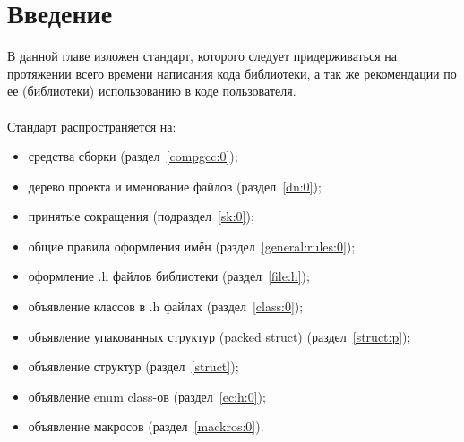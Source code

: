 \section{Введение}
В данной главе изложен стандарт, которого следует придерживаться на протяжении всего времени написания кода библиотеки, а так же рекомендации по ее (библиотеки) использованию в коде пользователя.\\\\
Стандарт распространяется на:
\begin{itemize}
	\item средства сборки (раздел~\ref{compgcc:0});
	\item дерево проекта и именование файлов (раздел~\ref{dn:0});
	\item принятые сокращения (подраздел~\ref{sk:0});
	\item общие правила оформления имён (раздел~\ref{general:rules:0});
	\item оформление .h файлов библиотеки (раздел~\ref{file:h});
	\item объявление классов в .h файлах (раздел~\ref{class:0});
	\item объявление упакованных структур (packed struct) (раздел~\ref{struct:p});
	\item объявление структур (раздел~\ref{struct});
	\item объявление enum class-ов (раздел~\ref{ec:h:0});
	\item объявление макросов (раздел~\ref{mackros:0}).
\end{itemize}

